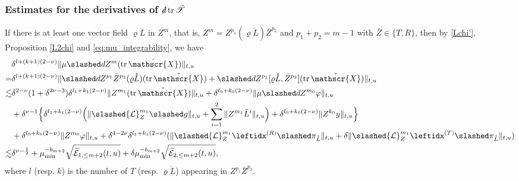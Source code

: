 \documentclass[11pt,twoside]{article}
\def\f{\frac}
\begin{document}
\subsubsection{Estimates for the derivatives of $\slashed d\operatorname{tr}\check{\mathscr{X}}$}\label{trchi}
If there is at least one vector field $\varrho\mathring L$ in $Z^m$, that is, $Z^m=Z^{p_1}(\varrho\mathring L)\bar Z^{p_2}$ and $p_1+p_2=m-1$ with $\bar Z\in\{T,R\}$, then by \eqref{Lchi'}, Proposition \ref{L2chi} and \eqref{eq:mu_integrability}, we have
\begin{align}
&\delta^{l+(k+1)(2-\nu)}\|\mu\slashed dZ^m(\operatorname{tr}\check{\mathscr{X}})\|_{t,u}\nonumber\\
=&\delta^{l+(k+1)(2-\nu)}\|\slashed dZ^{p_1}\bar Z^{p_2}(\varrho\mathring L) (\operatorname{tr}\check{\mathscr{X}})
+\slashed dZ^{p_1}[\varrho\mathring L,\bar Z^{p_2}](\operatorname{tr}\check{\mathscr{X}})\|_{t,u}\nonumber\\
\lesssim&\delta^{2-\nu}(1+\delta^{2\nu-3})\delta^{l_1+k_1(2-\nu)}\|Z^{m_1}(\operatorname{tr}\check{\mathscr{X}})\|_{t,u}+\delta^{l_0+k_0(2-\nu)}\|\mu\slashed dZ^{m_0}\varphi\|_{t,u}\nonumber\\
&+\delta^{\nu-1}\Big\{\delta^{l_1+k_1(2-\nu)}\Big(\|\slashed{\mathcal L}_Z^{m_1}\slashed g\|_{t,u}+\sum_{i=1}^2\|Z^{m_1}\check L^i\|_{t,u}\Big)+\delta^{l_0+k_0(2-\nu)}\|Z^{k_0}y\|_{t,u}\Big\}\nonumber\\
&+\delta^{l_0+k_0(2-\nu)}\|Z^{m_0}\varphi\|_{t,u}+\delta^{4-2\nu}\delta^{l_1+k_1(2-\nu)}(\|\slashed{\mathcal L}_Z^{m_1}\leftidx^{{(R)}}\slashed\pi_{\mathring L}\|_{t,u}+\delta\|\slashed{\mathcal L}_Z^{m_1}\leftidx^{{(T)}}\slashed\pi_{\mathring L}\|_{t,u})\nonumber\\
\lesssim&\delta^{\nu-\f12}+\mu_{\min}^{-b_{m+2}}\sqrt{\widetilde{\mathcal E}_{1,\leq m+2}(t,u)}+\delta\mu_{\min}^{-b_{m+2}}\sqrt{\widetilde{\mathcal E}_{2,\leq m+2}(t,u)},\label{ZmX}
\end{align}
where $l$ (resp. $k$) is the number of $T$ (resp. $\varrho\mathring L$) appearing in $Z^{p_1}\bar Z^{p_2}$.
\end{document}
